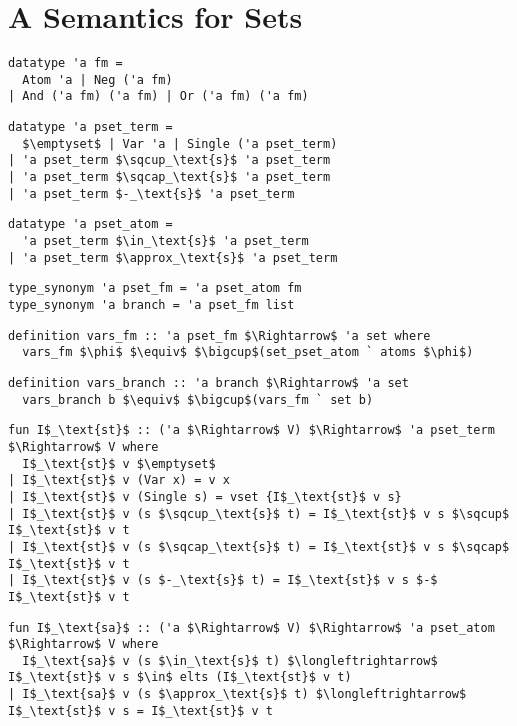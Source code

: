 \documentclass[sigplan,10pt,anonymous,review]{acmart}
\begin{document}
\section{A Semantics for Sets\label{sec:semantics}}
\begin{lstlisting}
datatype 'a fm =
  Atom 'a | Neg ('a fm)
| And ('a fm) ('a fm) | Or ('a fm) ('a fm)
\end{lstlisting}

\begin{lstlisting}
datatype 'a pset_term =
  $\emptyset$ | Var 'a | Single ('a pset_term)
| 'a pset_term $\sqcup_\text{s}$ 'a pset_term
| 'a pset_term $\sqcap_\text{s}$ 'a pset_term
| 'a pset_term $-_\text{s}$ 'a pset_term
\end{lstlisting}

\begin{lstlisting}
datatype 'a pset_atom =
  'a pset_term $\in_\text{s}$ 'a pset_term
| 'a pset_term $\approx_\text{s}$ 'a pset_term
\end{lstlisting}

\begin{lstlisting}
type_synonym 'a pset_fm = 'a pset_atom fm
type_synonym 'a branch = 'a pset_fm list
\end{lstlisting}

\begin{lstlisting}
definition vars_fm :: 'a pset_fm $\Rightarrow$ 'a set where
  vars_fm $\phi$ $\equiv$ $\bigcup$(set_pset_atom ` atoms $\phi$)
\end{lstlisting}

\begin{lstlisting}
definition vars_branch :: 'a branch $\Rightarrow$ 'a set 
  vars_branch b $\equiv$ $\bigcup$(vars_fm ` set b)
\end{lstlisting}


\begin{lstlisting}
fun I$_\text{st}$ :: ('a $\Rightarrow$ V) $\Rightarrow$ 'a pset_term $\Rightarrow$ V where
  I$_\text{st}$ v $\emptyset$
| I$_\text{st}$ v (Var x) = v x
| I$_\text{st}$ v (Single s) = vset {I$_\text{st}$ v s}
| I$_\text{st}$ v (s $\sqcup_\text{s}$ t) = I$_\text{st}$ v s $\sqcup$ I$_\text{st}$ v t 
| I$_\text{st}$ v (s $\sqcap_\text{s}$ t) = I$_\text{st}$ v s $\sqcap$ I$_\text{st}$ v t 
| I$_\text{st}$ v (s $-_\text{s}$ t) = I$_\text{st}$ v s $-$ I$_\text{st}$ v t 
\end{lstlisting}

\begin{lstlisting}
fun I$_\text{sa}$ :: ('a $\Rightarrow$ V) $\Rightarrow$ 'a pset_atom $\Rightarrow$ V where
  I$_\text{sa}$ v (s $\in_\text{s}$ t) $\longleftrightarrow$ I$_\text{st}$ v s $\in$ elts (I$_\text{st}$ v t)
| I$_\text{sa}$ v (s $\approx_\text{s}$ t) $\longleftrightarrow$ I$_\text{st}$ v s = I$_\text{st}$ v t
\end{lstlisting}
\end{document}
